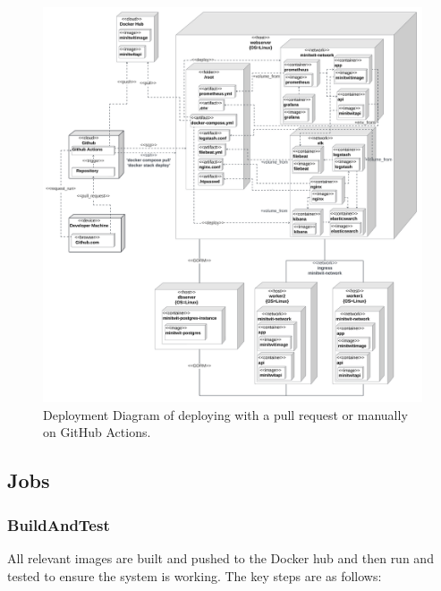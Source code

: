 \documentclass[12pt, a4paper, oneside]{book}
\begin{document}
\begin{figure}
    \centering
    \includegraphics[width=\linewidth]{images/uml-deployment-githubactions.png}
    \caption{Deployment Diagram of deploying with a pull request or manually on GitHub Actions.}
    \label{fig:deployment-cicd-minimal}
\end{figure}

\newpage

\subsection{Jobs}
\subsubsection{BuildAndTest}
All relevant images are built and pushed to the Docker hub and then run and tested to ensure the system is working. The key steps are as follows:
\end{document}
